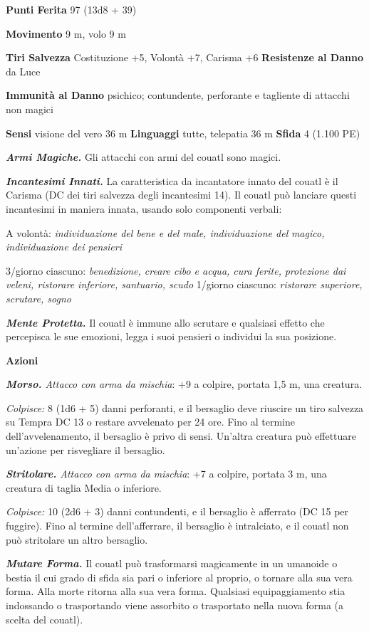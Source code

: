\begin{multicols}{2}
\textbf{Punti Ferita} 97 (13d8 + 39)

\textbf{Movimento} 9 m, volo 9 m

\textbf{Tiri Salvezza} Costituzione +5, Volontà +7, Carisma +6
\textbf{Resistenze al Danno} da Luce

\textbf{Immunità al Danno} psichico; contundente, perforante e tagliente
di attacchi non magici

\textbf{Sensi} visione del vero 36 m
\textbf{Linguaggi} tutte, telepatia 36 m \textbf{Sfida} 4 (1.100 PE)

\emph{\textbf{Armi Magiche.}} Gli attacchi con armi del couatl sono
magici.

\emph{\textbf{Incantesimi Innati.}} La caratteristica da incantatore
innato del couatl è il Carisma (DC dei tiri salvezza degli incantesimi
14). Il couatl può lanciare questi incantesimi in maniera innata, usando
solo componenti verbali:

A volontà: \emph{individuazione del bene e del male, individuazione del}
\emph{magico, individuazione dei pensieri}

3/giorno ciascuno: \emph{benedizione, creare cibo e acqua, cura ferite,}
\emph{protezione dai veleni, ristorare inferiore, santuario, scudo}
1/giorno ciascuno: \emph{ristorare superiore, scrutare, sogno}

\emph{\textbf{Mente Protetta.}} Il couatl è immune allo scrutare e
qualsiasi effetto che percepisca le sue emozioni, legga i suoi pensieri
o individui la sua posizione.

\textbf{Azioni}

\emph{\textbf{Morso.} Attacco con arma da mischia}: +9 a colpire,
portata 1,5 m, una creatura.

\emph{Colpisce:} 8 (1d6 + 5) danni perforanti, e il bersaglio deve
riuscire un tiro salvezza su Tempra DC 13 o restare avvelenato per
24 ore. Fino al termine dell'avvelenamento, il bersaglio è privo di
sensi. Un'altra creatura può effettuare un'azione per risvegliare il
bersaglio.

\emph{\textbf{Stritolare.} Attacco con arma da mischia}: +7 a colpire,
portata 3 m, una creatura di taglia Media o inferiore.

\emph{Colpisce:} 10 (2d6 + 3) danni contundenti, e il bersaglio è
afferrato (DC 15 per fuggire). Fino al termine dell'afferrare, il
bersaglio è intralciato, e il couatl non può stritolare un altro
bersaglio.

\emph{\textbf{Mutare Forma.}} Il couatl può trasformarsi magicamente in
un umanoide o bestia il cui grado di sfida sia pari o inferiore al
proprio, o tornare alla sua vera forma. Alla morte ritorna alla sua vera
forma. Qualsiasi equipaggiamento stia indossando o trasportando viene
assorbito o trasportato nella nuova forma (a scelta del couatl).


\end{multicols}
